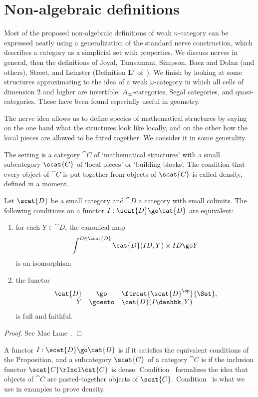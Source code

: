 \section{Non-algebraic definitions}

Most of the proposed non-algebraic definitions of weak $n$-category can be
expressed neatly using a generalization of the standard nerve construction,
which describes a category as a simplicial set with properties.  We discuss
nerves in general, then the definitions of Joyal, Tamsamani, Simpson, Baez
and Dolan (and others), Street, and Leinster (Definition $\mathbf{L'}$
of~\cite{SDN}).  We finish by looking at some structures approximating to
the idea of a weak $\omega$-category in which all cells of dimension $2$
and higher are invertible: $A_\infty$-categories, Segal categories, and
quasi-categories.  These have been found especially useful in geometry.


%
%
%

The nerve idea allows us to define species of mathematical structures by
saying on the one hand what the structures look like locally, and on the
other how the local pieces are allowed to be fitted together.  We consider
it in some generality.

The setting is a category $\cat{C}$ of `mathematical structures' with a
small subcategory $\scat{C}$ of `local pieces' or `building blocks'.  The
condition that every object of $\cat{C}$ is put together from objects of
$\scat{C}$ is called density, defined in a moment.

\begin{propn}
Let $\scat{D}$ be a small category and $\cat{D}$ a category with small
colimits.  The following conditions on a functor $I: \scat{D} \go \cat{D}$
are equivalent:
%
\begin{enumerate}
\item	{}
for each $Y\in\cat{D}$, the canonical map
\[
\int^{D\in\scat{D}} \cat{D}(ID, Y) \times ID
\go
Y
\]
is an isomorphism
\item	{}
the functor
\[
\begin{array}{rcl}
\cat{D}	&\go		&\ftrcat{\scat{D}^\op}{\Set},	\\
Y	&\goesto	&\cat{D}(I\dashbk, Y)
\end{array}
\]
is full and faithful.
\end{enumerate}
\end{propn}
%
\begin{proof}
See Mac Lane~\cite[X.6]{MacCWM}.
\done
\end{proof}
% 
A functor $I: \scat{D} \go \cat{D}$ is %
%
%
if it satisfies the
equivalent conditions of the Proposition, and a subcategory $\scat{C}$ of a
category $\cat{C}$ is  if the inclusion functor $\scat{C}
\rIncl \cat{C}$ is dense.  Condition~ formalizes the
idea that objects of $\cat{C}$ are pasted-together objects of $\scat{C}$.
Condition~ is what we use in examples to prove density.

